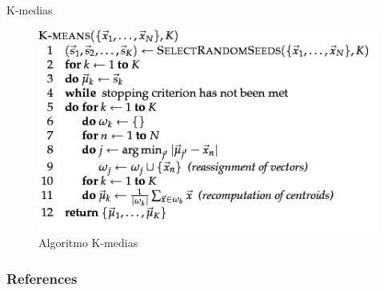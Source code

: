 \documentclass[handout]{beamer}
\begin{document}
\begin{frame}{K-medias}
\begin{figure}[h!]
	\centering
	\includegraphics[scale=0.6]{pics/kmeans.png}
	\caption{ Algoritmo K-medias}
\end{figure}


 



 
\end{frame}




\begin{frame}[allowframebreaks]\scriptsize
\frametitle{References}


%
\end{frame}



\end{document}

